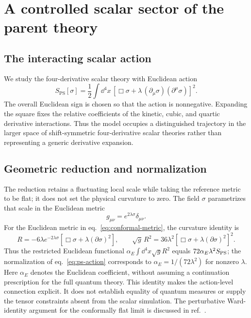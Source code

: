 \section{A controlled scalar sector of the parent theory}
\label{sec:model}

\subsection{The interacting scalar action}

We study the four-derivative scalar theory with Euclidean action
\begin{equation}
  S_{\mathrm{PS}}[\sigma]
  = \frac{1}{2}\int \dd^4x\,
  \left[\Box\sigma + \lambda\,(\partial_\mu\sigma)(\partial^\mu\sigma)\right]^2.
  \label{eq:ps-action}
\end{equation}
The overall Euclidean sign is chosen so that the action is nonnegative.  Expanding the square fixes the relative coefficients of the kinetic, cubic, and quartic derivative interactions.  Thus the model occupies a distinguished trajectory in the larger space of shift-symmetric four-derivative scalar theories rather than representing a generic derivative expansion.

\subsection{Geometric reduction and normalization}
\label{sec:cosmological-action}

The reduction retains a fluctuating local scale while taking the reference metric to be flat; it does not set the physical curvature to zero.  The field $\sigma$ parametrizes that scale in the Euclidean metric
\begin{equation}
 g_{\mu\nu}=e^{2\lambda\sigma}\delta_{\mu\nu}.
 \label{eq:conformal-metric}
\end{equation}
For the Euclidean metric in eq.~\eqref{eq:conformal-metric}, the curvature identity is
\begin{equation}
 R=-6\lambda e^{-2\lambda\sigma}
 \left[\Box\sigma+\lambda(\partial\sigma)^2\right],
 \qquad
 \sqrt{g}\,R^2=36\lambda^2
 \left[\Box\sigma+\lambda(\partial\sigma)^2\right]^2.
 \label{eq:conformal-r-squared}
\end{equation}
Thus the restricted Euclidean functional $\alpha_E\int\dd^4x\sqrt{g}R^2$ equals $72\alpha_E\lambda^2S_{\rm PS}$; the normalization of eq.~\eqref{eq:ps-action} corresponds to $\alpha_E=1/(72\lambda^2)$ for nonzero $\lambda$.  Here $\alpha_E$ denotes the Euclidean coefficient, without assuming a continuation prescription for the full quantum theory.  This identity makes the action-level connection explicit.  It does not establish equality of quantum measures or supply the tensor constraints absent from the scalar simulation.  The perturbative Ward-identity argument for the conformally flat limit is discussed in ref.~\cite{Anderson:2026}.


